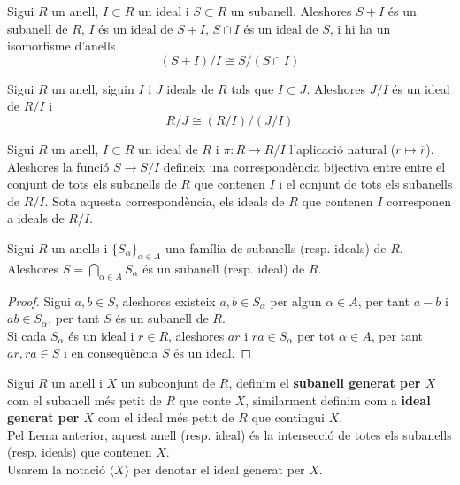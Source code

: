 \begin{theorem}
Sigui $R$ un anell, $I\subset R$ un ideal i $S\subset R$ un subanell. Aleshores $S+I$ és un subanell de $R$, $I$ és un ideal de $S+I$, $S\cap I$ és un ideal de $S$, i hi ha un isomorfisme d'anells
$$
(S+I)/I \cong S/(S\cap I)
$$
\end{theorem}
\begin{theorem} Sigui $R$ un anell, siguin $I$ i $J$ ideals de $R$ tals que $I\subset J$. Aleshores $J/I$ és un ideal de $R/I$ i
$$
R/J \cong (R/I)/(J/I)
$$
\end{theorem}
\begin{theorem}
Sigui $R$ un anell, $I\subset R$ un ideal de $R$ i $\pi: R \rightarrow R/I$ l'aplicació natural ($r\mapsto \overline{r}$). Aleshores la funció $S\rightarrow S/I$ defineix una correspondència bijectiva entre entre el conjunt de tots els subanells de $R$ que contenen $I$ i el conjunt de tots els subanells de $R/I$. Sota aquesta correspondència, els ideals de $R$ que contenen $I$ corresponen a ideals de $R/I$.
\end{theorem}
\begin{lemma}
 Sigui $R$ un anells i $\{S_{\alpha}\}_{\alpha \in A}$ una família de subanells (resp. ideals) de $R$. Aleshores $S=\bigcap_{\alpha \in A}S_\alpha$ és un subanell (resp. ideal) de $R$.
\end{lemma} 
\begin{proof} Sigui $a,b \in S$, aleshores existeix $a,b\in S_\alpha$ per algun $\alpha \in A$, per tant $a-b$ i $ab\in S_\alpha$, per tant $S$ és un subanell de $R$. \\
Si cada $S_\alpha$ és un ideal i $r\in R$, aleshores $ar$ i $ra\in S_\alpha$ per tot $\alpha \in A$, per tant $ar,ra\in S$ i en conseqüència $S$ és un ideal. 
\end{proof}

\begin{definition}
Sigui $R$ un anell i $X$ un subconjunt de $R$, definim el \textbf{subanell generat per $X$} com el subanell més petit de $R$ que conte $X$, similarment definim com a \textbf{ideal generat per $X$} com el ideal més petit de $R$ que contingui $X$. 
\\
Pel Lema anterior, aquest anell (resp. ideal) és la intersecció de totes els subanells (resp. ideals) que contenen $X$.  \\
Usarem la notació $\langle X \rangle$ per denotar el ideal generat per $X$.
\end{definition}

